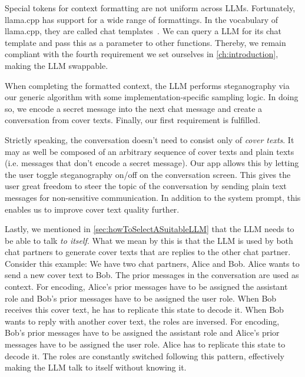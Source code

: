 Special tokens for context formatting are not uniform across \glspl{LLM}. Fortunately, llama.cpp has support for a wide range of formattings. In the vocabulary of llama.cpp, they are called chat templates~\cite{gerganovGgerganovLlamacpp2024,jiangChatBugCommonVulnerability2025}. We can query a \gls{LLM} for its chat template and pass this as a parameter to other functions. Thereby, we remain compliant with the fourth requirement we set ourselves in \cref{ch:introduction}, making the \gls{LLM} swappable.

When completing the formatted context, the \gls{LLM} performs steganography via our generic algorithm with some implementation-specific sampling logic. In doing so, we encode a secret message into the next chat message and create a conversation from cover texts. Finally, our first requirement is fulfilled.

Strictly speaking, the conversation doesn't need to consist only of \textit{cover texts}. It may as well be composed of an arbitrary sequence of cover texts and plain texts (i.e. messages that don't encode a secret message). Our app allows this by letting the user toggle steganography on/off on the conversation screen. This gives the user great freedom to steer the topic of the conversation by sending plain text messages for non-sensitive communication. In addition to the system prompt, this enables us to improve cover text quality further.

Lastly, we mentioned in \cref{sec:howToSelectASuitableLLM} that the \gls{LLM} needs to be able to talk \textit{to itself}. What we mean by this is that the \gls{LLM} is used by both chat partners to generate cover texts that are replies to the other chat partner. Consider this example: We have two chat partners, Alice and Bob. Alice wants to send a new cover text to Bob. The prior messages in the conversation are used as context. For encoding, Alice's prior messages have to be assigned the assistant role and Bob's prior messages have to be assigned the user role. When Bob receives this cover text, he has to replicate this state to decode it. When Bob wants to reply with another cover text, the roles are inversed. For encoding, Bob's prior messages have to be assigned the assistant role and Alice's prior messages have to be assigned the user role. Alice has to replicate this state to decode it. The roles are constantly switched following this pattern, effectively making the \gls{LLM} talk to itself without knowing it.

